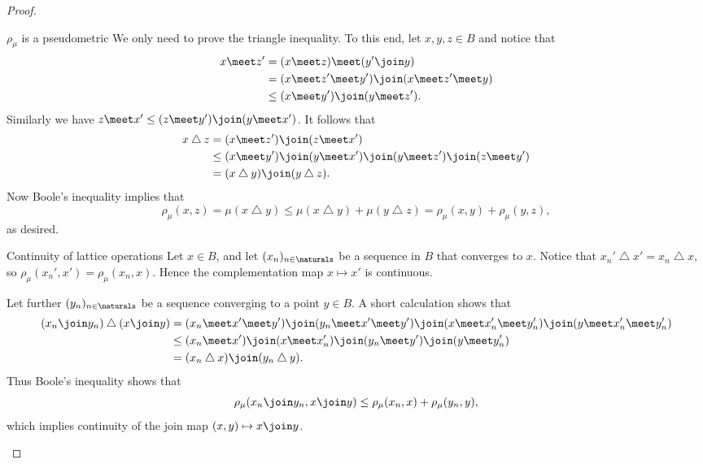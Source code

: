 \documentclass[article, a4paper, 11pt, oneside]{memoir}
\numberwithin{equation}{chapter}
\renewcommand{\symdiff}{\mathbin{\triangle}}
\begin{document}
\begin{proof}
\begin{proofsec}
    \item[$\rho_\mu$ is a pseudometric]
    We only need to prove the triangle inequality. To this end, let $x,y,z \in B$ and notice that
    \begin{align*}
        x \meet z'
            &= (x \meet z) \meet (y' \join y) \\
            &= (x \meet z' \meet y') \join (x \meet z' \meet y) \\
            &\leq (x \meet y') \join (y \meet z').
    \end{align*}
    Similarly we have $z \meet x' \leq (z \meet y') \join (y \meet x')$. It follows that
    \begin{align*}
        x \symdiff z
            &= (x \meet z') \join (z \meet x') \\
            &\leq (x \meet y') \join (y \meet x') \join
                  (y \meet z') \join (z \meet y') \\
            &= (x \symdiff y) \join (y \symdiff z).
    \end{align*}
    Now Boole's inequality implies that
    \begin{equation*}
        \rho_\mu(x,z)
            = \mu(x \symdiff y)
            \leq \mu(x \symdiff y) + \mu(y \symdiff z)
            = \rho_\mu(x,y) + \rho_\mu(y,z),
    \end{equation*}
    as desired.

    \item[Continuity of lattice operations]
    Let $x \in B$, and let $(x_n)_{n\in\naturals}$ be a sequence in $B$ that converges to $x$. Notice that $x_n' \symdiff x' = x_n \symdiff x$, so $\rho_\mu(x_n',x') = \rho_\mu(x_n,x)$. Hence the complementation map $x \mapsto x'$ is continuous.

    Let further $(y_n)_{n\in\naturals}$ be a sequence converging to a point $y \in B$. A short calculation shows that
    \begin{align*}
        (x_n \join y_n) \symdiff (x \join y)
            &= (x_n \meet x' \meet y') \join
               (y_n \meet x' \meet y') \join
               (x \meet x_n' \meet y_n') \join
               (y \meet x_n' \meet y_n') \\
            &\leq (x_n \meet x') \join
            (x \meet x_n') \join
            (y_n \meet y') \join
            (y \meet y_n') \\
            &= (x_n \symdiff x) \join (y_n \symdiff y).
    \end{align*}
    Thus Boole's inequality shows that
    \begin{equation}
        \label{eq:join-continuous}
        \rho_\mu(x_n \join y_n, x \join y)
            \leq \rho_\mu(x_n,x) + \rho_\mu(y_n,y),
    \end{equation}
    which implies continuity of the join map $(x,y) \mapsto x \join y$.


\end{proofsec}
\end{proof}
\end{document}
